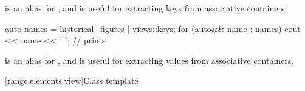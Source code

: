 \pnum
{} is an alias for , and
is useful for extracting keys from associative containers.

\begin{example}
\begin{codeblock}
auto names = historical_figures | views::keys;
for (auto&& name : names) {
  cout << name << ' ';          // prints 
}
\end{codeblock}
\end{example}

\pnum
{} is an alias for , and
is useful for extracting values from associative containers.

\begin{example}
\end{example}

[range.elements.view]{Class template }

